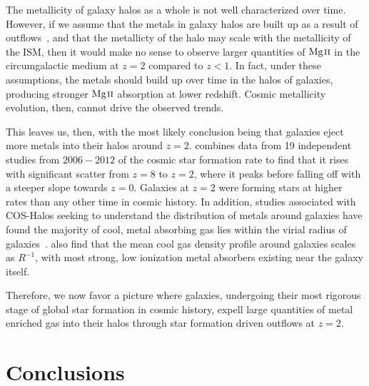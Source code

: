 \documentclass[iop,apj,numberedappendix,appendixfloats,twocolappendix]{emulateapj}
\begin{document}
The metallicity of galaxy halos as a whole is not well characterized over time. However, if we assume that the metals in galaxy halos are built up as a result of outflows~\citep{Quiret2016}, and that the metallicty of the halo may scale with the metallicity of the ISM, then it would make no sense to observe larger quantities of ${\hbox{{\rm Mg}\kern 0.1em{\sc ii}}}$ in the circumgalactic medium at $z = 2$ compared to $z < 1$. In fact, under these assumptions, the metals should build up over time in the halos of galaxies, producing stronger ${\hbox{{\rm Mg}\kern 0.1em{\sc ii}}}$ absorption at lower redshift. Cosmic metallicity evolution, then, cannot drive the observed trends.

This leaves us, then, with the most likely conclusion being that galaxies eject more metals into their halos around $z = 2$. \cite{Behroozi2013sfr} combines data from 19 independent studies from $2006-2012$ of the cosmic star formation rate to find that it rises with significant scatter from $z=8$ to $z=2$, where it peaks before falling off with a steeper slope towards $z = 0$. Galaxies at $z=2$ were forming stars at higher rates than any other time in cosmic history. In addition, studies associated with COS-Halos seeking to understand the distribution of metals around galaxies have found the majority of cool, metal absorbing gas lies within the virial radius of galaxies~\citep{Peeples2014}. \cite{Stern2016} also find that the mean cool gas density profile around galaxies scales as $R^{-1}$, with most strong, low ionization metal absorbers existing near the galaxy itself. 

Therefore, we now favor a picture where galaxies, undergoing their most rigorous stage of global star formation in cosmic history, expell large quantities of metal enriched gas into their halos through star formation driven outflows at $z = 2$. 


\section{Conclusions}
\label{sec:conclusions}
\end{document}
